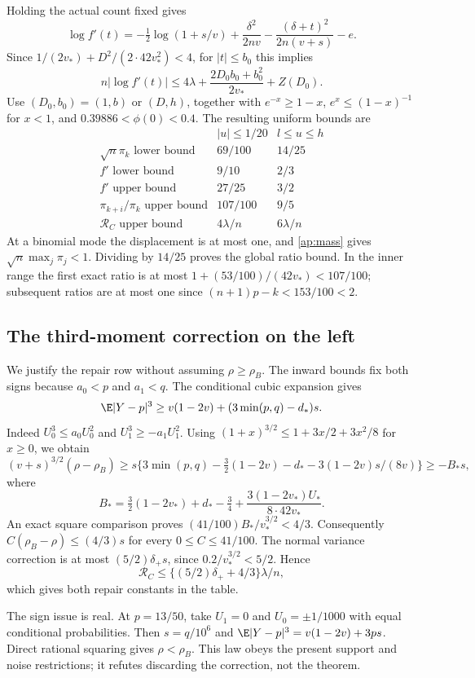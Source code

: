 Holding the actual count fixed gives
\[
 \log f'(t)=-\tfrac12\log(1+s/v)+\frac{\delta^2}{2nv}
            -\frac{(\delta+t)^2}{2n(v+s)}-e.
\]
Since $1/(2v_*)+D^2/(2\cdot42v_*^2)<4$, for $|t|\le b_0$ this implies
\[
 n|\log f'(t)|\le4\lambda+
            \frac{2D_0b_0+b_0^2}{2v_*}+Z(D_0).
\]
Use $(D_0,b_0)=(1,b)$ or $(D,h)$, together with
$e^{-x}\ge1-x$, $e^x\le(1-x)^{-1}$ for $x<1$, and
$0.39886<\phi(0)<0.4$. The resulting uniform bounds are
\[
\begin{array}{c|cc}
 &|u|\le1/20&l\le u\le h\\\hline
 \sqrt n\pi_k\text{ lower bound}&69/100&14/25\\
 f'\text{ lower bound}&9/10&2/3\\
 f'\text{ upper bound}&27/25&3/2\\
 \pi_{k+i}/\pi_k\text{ upper bound}&107/100&9/5\\
 \mathcal R_C\text{ upper bound}&4\lambda/n&6\lambda/n
\end{array}
\]
At a binomial mode the displacement is at most one, and
\eqref{ap:mass} gives $\sqrt n\max_j\pi_j<1$. Dividing by $14/25$
proves the global ratio bound. In the inner range the first exact ratio
is at most $1+(53/100)/(42v_*)<107/100$; subsequent ratios are at most
one since $(n+1)p-k<153/100<2$.

\subsection{The third-moment correction on the left}
We justify the repair row without assuming $\rho\ge\rho_B$.
The inward bounds fix both signs because $a_0<p$ and $a_1<q$.
The conditional cubic expansion gives
\[
 \E|Y-p|^3\ge v(1-2v)+(3\min(p,q)-d_*)s.
\]
Indeed $U_0^3\le a_0U_0^2$ and $U_1^3\ge-a_1U_1^2$.
Using $(1+x)^{3/2}\le1+3x/2+3x^2/8$ for $x\ge0$, we obtain
\[
 (v+s)^{3/2}(\rho-\rho_B)
 \ge s\{3\min(p,q)-\tfrac32(1-2v)-d_*
                         -3(1-2v)s/(8v)\}\ge-B_*s,
\]
where
\[
 B_*=\tfrac32(1-2v_*)+d_*-\tfrac34
              +\frac{3(1-2v_*)U_*}{8\cdot42v_*}.
\]
An exact square comparison proves
$(41/100)B_*/v_*^{3/2}<4/3$. Consequently
$C(\rho_B-\rho)\le(4/3)s$ for every $0\le C\le41/100$.
The normal variance correction is at most $(5/2)\delta_+s$, since
$0.2/v_*^{3/2}<5/2$. Hence
\[
 \mathcal R_C\le\{(5/2)\delta_++4/3\}\lambda/n,
\]
which gives both repair constants in the table.

The sign issue is real. At $p=13/50$, take $U_1=0$ and
$U_0=\pm1/1000$ with equal conditional probabilities. Then
$s=q/10^6$ and
$\E|Y-p|^3=v(1-2v)+3ps$. Direct rational squaring gives
$\rho<\rho_B$. This law obeys the present support and noise restrictions;
it refutes discarding the correction, not the theorem.

